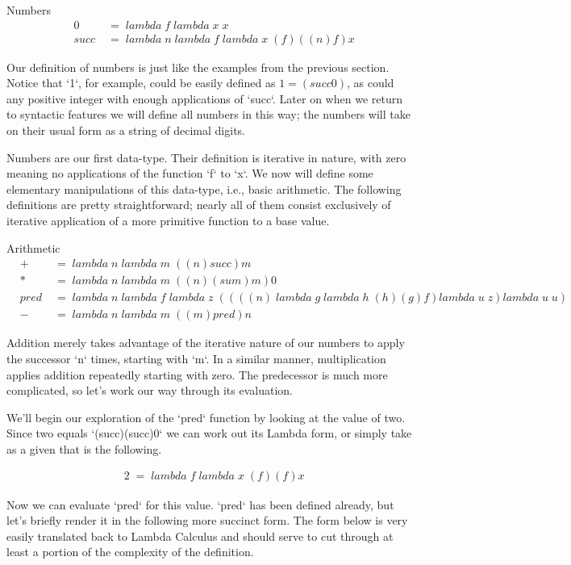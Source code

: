 Numbers
\begin{align*}
& 0 \; &= \; lambda \; f \; lambda \; x \; x
\\& succ \; &= \; lambda \; n \; lambda \; f \; lambda \; x \; (f)((n)f)x
\end{align*}

Our definition of numbers is just like the examples from the previous section.
Notice that `1`, for example, could be easily defined as $1 = (succ 0)$, as could
any positive integer with enough applications of `succ`. Later on when we return
to syntactic features we will define all numbers in this way; the numbers will
take on their usual form as a string of decimal digits.

Numbers are our first data-type. Their definition is iterative in nature, with
zero meaning no applications of the function `f` to `x`. We now will define some
elementary manipulations of this data-type, i.e., basic arithmetic. The following
definitions are pretty straightforward; nearly all of them consist exclusively of
iterative application of a more primitive function to a base value.

Arithmetic
\begin{align*}
& + \; &= \; lambda \; n \; lambda \; m \; ((n)succ)m
\\& * \; &= \; lambda \; n \; lambda \; m \; ((n)(sum)m)0
\\& pred \; &= \; lambda \; n \; lambda \; f \; lambda \; z \; ((((n) \; lambda \; g \; lambda \; h \; (h)(g)f)lambda \; u \; z)lambda \; u \; u)
\\& - \; &= \; lambda \; n \; lambda \; m \; ((m)pred)n
\end{align*}

Addition merely takes advantage of the iterative nature of our numbers to apply
the successor `n` times, starting with `m`. In a similar manner, multiplication
applies addition repeatedly starting with zero. The predecessor is much more
complicated, so let's work our way through its evaluation.

We'll begin our exploration of the `pred` function by looking at the value of two. 
Since two equals `(succ)(succ)0` we can work out its Lambda form, or simply take
as a given that is the following.

\begin{align*}
& 2 \; = \; lambda \; f \; lambda \; x \; (f)(f)x
\end{align*}

Now we can evaluate `pred` for this value. `pred` has been defined already, but
let's briefly render it in the following more succinct form. The form below is
very easily translated back to Lambda Calculus and should serve to cut through at
least a portion of the complexity of the definition.

